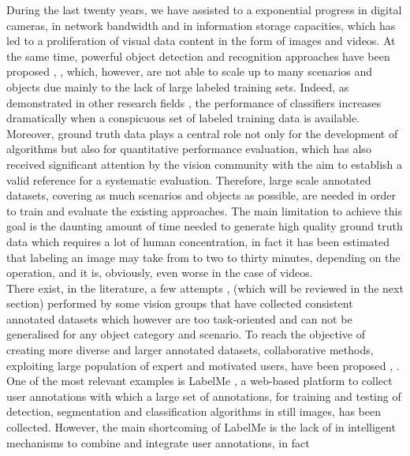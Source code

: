 During the last twenty years, we have assisted to a exponential progress in digital cameras, in network bandwidth and in information storage capacities, which has led to a proliferation of visual data content in the form of images and videos. 
At the same time, powerful object detection and recognition approaches have been proposed \cite{}, \cite{}, \cite{} which, however, are not able to scale up to many scenarios and objects due mainly to the lack of large labeled training sets.  Indeed, as demonstrated in other research fields \cite{speech}, \cite{bio} the performance of classifiers increases dramatically when a conspicuous set of labeled training data is available. Moreover, ground truth data plays a central role not only for the development of algorithms but also for quantitative performance evaluation, which has also received significant attention by the vision community with the aim to establish a valid reference for a systematic evaluation. 
Therefore,  large scale annotated datasets, covering as much scenarios and objects as possible, are needed in order to train and  evaluate the existing approaches. The main limitation to achieve this goal is the daunting amount of time needed to generate high quality ground truth data which requires a lot of human concentration, in fact it has been estimated that labeling an image may take   from to two to thirty minutes, depending on the operation, and it is, obviously, even worse in the case of videos. \\
There exist, in the literature, a few attempts \cite{}, \cite{} (which will be reviewed in the next section) performed by some vision groups that have collected consistent annotated datasets which however are too task-oriented and can not be generalised for any object category and scenario.  
To reach the objective of creating more diverse and larger annotated datasets, collaborative methods, exploiting large population of expert and motivated users, have been proposed \cite{}, \cite{}. 
One of the most relevant examples is LabelMe \cite{}, a web-based platform to collect user annotations with which a large set of annotations, for training and testing of detection, segmentation and classification algorithms in still images, has been collected.  However, the main shortcoming of LabelMe is the lack of in intelligent mechanisms to combine and integrate user annotations, in fact 
